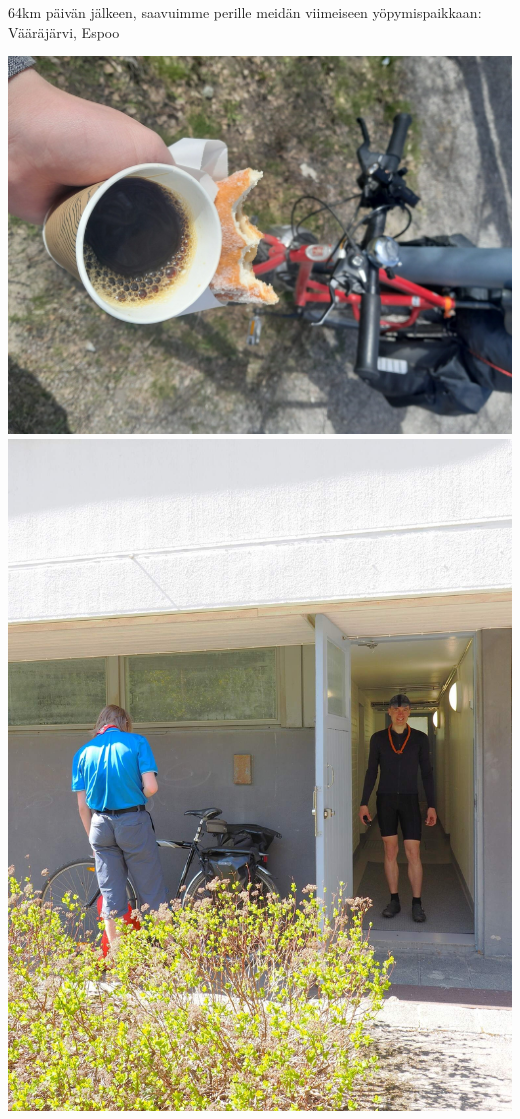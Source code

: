 \begin{multicols}{2}
\begin{center}
	\end{center}
	\begin{addmargin}[0.32cm]{0cm}
		{\small
		64km päivän jälkeen, saavuimme perille meidän viimeiseen
		yöpymispaikkaan: Vääräjärvi, Espoo}
	\end{addmargin}
\end{multicols}


\begin{multicols}{2}
	\begin{center}
		\noindent\includegraphics[width=1.05\linewidth]{assets/pyörävaellus25}
		\noindent\includegraphics[width=1.05\linewidth]{assets/pyörävaellus26}

\end{center}
\end{multicols}
